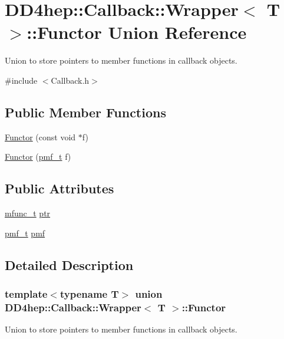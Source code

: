 \hypertarget{union_d_d4hep_1_1_callback_1_1_wrapper_1_1_functor}{
\section{DD4hep::Callback::Wrapper$<$ T $>$::Functor Union Reference}
\label{union_d_d4hep_1_1_callback_1_1_wrapper_1_1_functor}
}


Union to store pointers to member functions in callback objects.  


{\ttfamily \#include $<$Callback.h$>$}\subsection*{Public Member Functions}
\begin{DoxyCompactItemize}
\item 
\hyperlink{union_d_d4hep_1_1_callback_1_1_wrapper_1_1_functor_aa5d398e7679a40c08f44253099d14476}{Functor} (const void $\ast$f)
\item 
\hyperlink{union_d_d4hep_1_1_callback_1_1_wrapper_1_1_functor_a866665797965a87012088cfc1444a0ca}{Functor} (\hyperlink{class_t}{pmf\_\-t} f)
\end{DoxyCompactItemize}
\subsection*{Public Attributes}
\begin{DoxyCompactItemize}
\item 
\hyperlink{struct_d_d4hep_1_1_callback_1_1mfunc__t}{mfunc\_\-t} \hyperlink{union_d_d4hep_1_1_callback_1_1_wrapper_1_1_functor_aa729847f113eb9d2b69d7fd602c50f77}{ptr}
\item 
\hyperlink{class_t}{pmf\_\-t} \hyperlink{union_d_d4hep_1_1_callback_1_1_wrapper_1_1_functor_afbf0fb7951a0a816b42866d0492628d3}{pmf}
\end{DoxyCompactItemize}


\subsection{Detailed Description}
\subsubsection*{template$<$typename T$>$ union DD4hep::Callback::Wrapper$<$ T $>$::Functor}

Union to store pointers to member functions in callback objects. 

